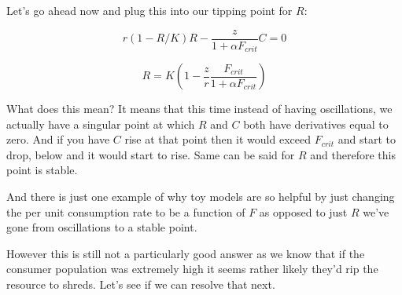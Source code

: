 \documentclass[11pt,a5paper]{book}
\begin{document}
Let's go ahead now and plug this into our tipping point for $R$:

$$r(1-R/K)R-\frac{z}{1+\alpha F_{crit}}C = 0$$

$$R = K\left( 1 - \frac{z}{r}\frac{F_{crit}}{1+\alpha F_{crit}}\right)$$

What does this mean? It means that this time instead of having oscillations, we actually have a singular point at which $R$ and $C$ both have derivatives equal to zero. And if you have $C$ rise at that point then it would exceed $F_{crit}$ and start to drop, below and it would start to rise. Same can be said for $R$ and therefore this point is stable. 

And there is just one example of why toy models are so helpful by just changing the per unit consumption rate to be a function of $F$ as opposed to just $R$ we've gone from oscillations to a stable point. 

However this is still not a particularly good answer as we know that if the consumer population was extremely high it seems rather likely they'd rip the resource to shreds. Let's see if we can resolve that next. 
\end{document}

